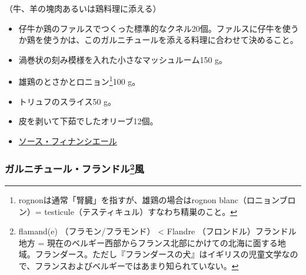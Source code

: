 \begin{recette}

（牛、羊の塊肉あるいは鶏料理に添える）

\begin{itemize}
\item
  仔牛か鶏のファルスでつくった標準的なクネル20個。ファルスに仔牛を使うか鶏を使うかは、このガルニチュールを添える料理に合わせて決めること。
\item
  渦巻状の刻み模様を入れた小さなマッシュルーム150 g。
\item
  雄鶏のとさかとロニョン\footnote{rognonは通常「腎臓」を指すが、雄鶏の場合はrognon
    blanc（ロニョンブロン）=
    testicule（テスティキュル）すなわち精巣のこと。}100 g。
\item
  トリュフのスライス50 g。
\item
  皮を剥いて下茹でしたオリーブ12個。
\item
  \protect\hyperlink{sauce-financiere}{ソース・フィナンシエール}
\end{itemize}

\hypertarget{garniture-a-la-flamande}{%
\subsubsection[ガルニチュール・フランドル風]{\texorpdfstring{ガルニチュール・フランドル\footnote{flamand(e)
  （フラモン/フラモンド） \textless{} Flandre
  （フロンドル）フランドル地方 =
  現在のベルギー西部からフランス北部にかけての北海に面する地域。フランダース。ただし『フランダースの犬』はイギリスの児童文学なので、フランスおよびベルギーではあまり知られていない。}風}{ガルニチュール・フランドル風}}\label{garniture-a-la-flamande}}




\end{recette}
